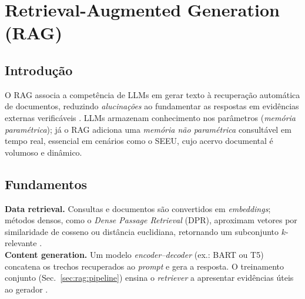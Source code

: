\section{Retrieval-Augmented Generation (RAG)}
\label{sec:rag}

\subsection{Introdução}
O RAG associa a competência de LLMs em gerar texto à recuperação automática de
documentos, reduzindo \textit{alucinações} ao fundamentar as respostas em
evidências externas verificáveis
\cite{lewis2020rag,gao2023survey,edwards2024hybrid,pujiono2024implementing}.
LLMs armazenam conhecimento nos parâmetros (\emph{memória paramétrica}); já o
RAG adiciona uma \emph{memória não paramétrica} consultável em tempo real,
essencial em cenários como o SEEU, cujo acervo documental é volumoso e
dinâmico.

\subsection{Fundamentos}
\textbf{Data retrieval.} Consultas e documentos são convertidos em
\emph{embeddings}; métodos densos, como o \textit{Dense Passage Retrieval}
(DPR), aproximam vetores por similaridade de cosseno ou distância euclidiana,
retornando um subconjunto $k$-relevante
\cite{lewis2020rag,taipalus2024vector,mageirakos2025cracking}.\\
\textbf{Content generation.} Um modelo \emph{encoder--decoder} (ex.: BART ou
T5) concatena os trechos recuperados ao \textit{prompt} e gera a resposta. O
treinamento conjunto (Sec.~\ref{sec:rag:pipeline}) ensina o \textit{retriever}
a apresentar evidências úteis ao gerador
\cite{aquino2024extracting,belarmino2025aplicacao}.

